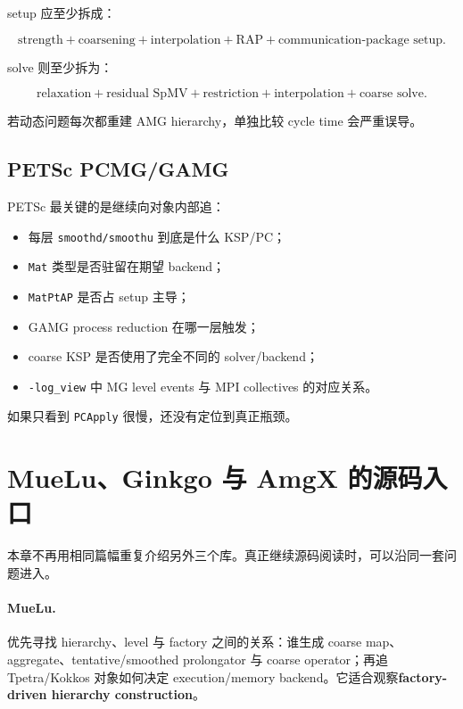 setup 应至少拆成：

\begin{equation}
\text{strength}
+
\text{coarsening}
+
\text{interpolation}
+
\text{RAP}
+
\text{communication-package setup}.
\end{equation}

solve 则至少拆为：

\begin{equation}
\text{relaxation}
+
\text{residual SpMV}
+
\text{restriction}
+
\text{interpolation}
+
\text{coarse solve}.
\end{equation}

若动态问题每次都重建 AMG hierarchy，单独比较 cycle time 会严重误导。

\subsection{PETSc PCMG/GAMG}

PETSc 最关键的是继续向对象内部追：

\begin{itemize}
\item 每层 \texttt{smoothd/smoothu} 到底是什么 KSP/PC；
\item \texttt{Mat} 类型是否驻留在期望 backend；
\item \texttt{MatPtAP} 是否占 setup 主导；
\item GAMG process reduction 在哪一层触发；
\item coarse KSP 是否使用了完全不同的 solver/backend；
\item \texttt{-log\_view} 中 MG level events 与 MPI collectives 的对应关系。
\end{itemize}

如果只看到 \texttt{PCApply} 很慢，还没有定位到真正瓶颈。

\section{MueLu、Ginkgo 与 AmgX 的源码入口}

本章不再用相同篇幅重复介绍另外三个库。真正继续源码阅读时，可以沿同一套问题进入。

\paragraph{MueLu.}
优先寻找 hierarchy、level 与 factory 之间的关系：谁生成 coarse map、aggregate、tentative/smoothed prolongator 与 coarse operator；再追 Tpetra/Kokkos 对象如何决定 execution/memory backend。它适合观察\textbf{factory-driven hierarchy construction}。

